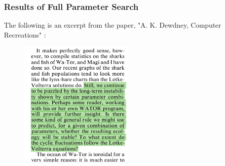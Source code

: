 \documentclass{beamer}
\begin{document}
\frame
{
	\frametitle{Results of Full Parameter Search}
	  The following is an excerpt from the paper, "A. K. Dewdney, Computer Recreations"  :
	  \begin{figure}[H]
  		\centering
		\includegraphics[width = 0.5\textwidth]{./pics/paper_predatorprey.png}
        \label{refpaper}
  \end{figure}

}
\end{document}
